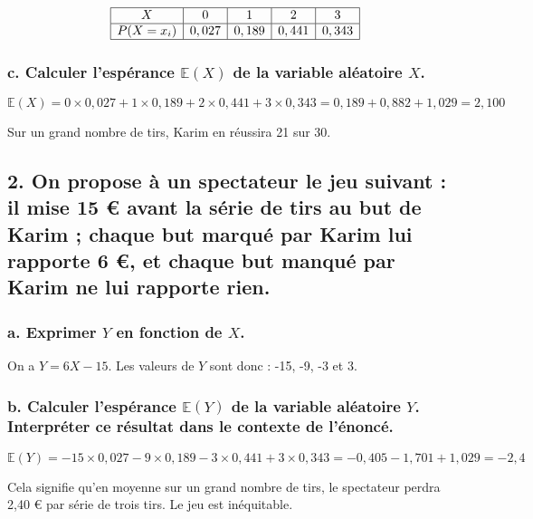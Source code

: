\documentclass[10pt]{article}
\begin{document}
	\[
	\begin{array}{|c|c|c|c|c|}
		\hline
			X & 0 & 1 & 2 & 3 \\
		\hline
		P(X = x_i) & 0,027 & 0,189 & 0,441 & 0,343 \\
			\hline
	\end{array}
	\]
	
	\subsubsection*{c. Calculer l'espérance $\mathbb{E}(X)$ de la variable aléatoire $X$.}
	
	\[
	\mathbb{E}(X) = 0 \times 0,027 + 1 \times 0,189 + 2 \times 0,441 + 3 \times 0,343 = 0,189 + 0,882 + 1,029 = 2,100
	\]
	
	Sur un grand nombre de tirs, Karim en réussira 21 sur 30.
	
	\subsection*{2. On propose à un spectateur le jeu suivant : il mise 15 € avant la série de tirs au but de Karim ; chaque but marqué par Karim lui rapporte 6 €, et chaque but manqué par Karim ne lui rapporte rien.}
	
	\subsubsection*{a. Exprimer $Y$ en fonction de $X$.}
	
	On a $Y = 6X - 15$. Les valeurs de $Y$ sont donc : -15, -9, -3 et 3.
	
	\subsubsection*{b. Calculer l'espérance $\mathbb{E}(Y)$ de la variable aléatoire $Y$. Interpréter ce résultat dans le contexte de l'énoncé.}
	
	\[
	\mathbb{E}(Y) = -15 \times 0,027 - 9 \times 0,189 - 3 \times 0,441 + 3 \times 0,343 = -0,405 - 1,701 + 1,029 = -2,4
	\]
	
	Cela signifie qu'en moyenne sur un grand nombre de tirs, le spectateur perdra 2,40 € par série de trois tirs. Le jeu est inéquitable.
\end{document}
